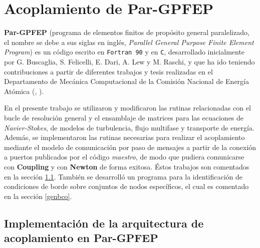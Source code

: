 \chapter{Acoplamiento de \textbf{Par-GPFEP}}
\label{C:pargpfep}

\textbf{Par-GPFEP} (programa de elementos finitos de propósito general paralelizado, el nombre se debe a sus siglas
en inglés, \textit{Parallel General Purpose Finite Element Program})
es un código escrito en \texttt{Fortran 90} y en \texttt{C},
desarrollado inicialmente por G. Buscaglia, S. Felicelli, E. Dari, A. Lew y M. Raschi,
y que ha ido teniendo contribuciones a partir de diferentes trabajos y tesis realizadas
en el Departamento de Mecánica Computacional de la Comisión Nacional de Energía Atómica (\cite{gpfep}, \cite{pargpfep}).

En el presente trabajo se utilizaron y modificaron las rutinas relacionadas con el bucle de resolución general
y el ensamblaje de matrices para las ecuaciones de \textit{Navier-Stokes}, de modelos de turbulencia, flujo multifase y transporte de energía.
Además, se implementaron las rutinas necesarias para realizar el acoplamiento mediante el modelo de comunicación por paso de mensajes
a partir de la conexión a puertos publicados por el código \textit{maestro}, de modo que pudiera comunicarse con \textbf{Coupling} y con \textbf{Newton} de forma exitosa.
Éstos trabajos son comentados en la sección \ref{pargpfep-impl}.
También se desarrolló un programa para la identificación de condiciones de borde sobre conjuntos de nodos específicos, el cual es comentado en la sección \ref{genbco}.

\section{Implementación de la arquitectura de acoplamiento en \textbf{Par-GPFEP}}
\label{pargpfep-impl}

